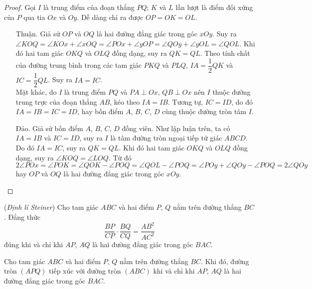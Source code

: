 \documentclass{article} %
\begin{document}
        \begin{proof}
            Gọi \(I\) là trung điểm của đoạn thẳng \(PQ\); \(K\) và \(L\) lần lượt là điểm đối xứng của \(P\) qua tia \(Ox\) và \(Oy\). Dễ dàng chỉ ra được \(OP = OK = OL\).

            \begin{enumerate}[leftmargin=1.25cm]
                \item[Thuận.] Giả sử \(OP\) và \(OQ\) là hai đường đẳng giác trong góc \(xOy\). Suy ra \(\angle KOQ = \angle KOx + \angle xOQ = \angle POx + \angle yOP = \angle QOy + \angle yOL = \angle QOL\). Khi đó hai tam giác \(OKQ\) và \(OLQ\) đồng dạng, suy ra \(QK = QL\). Theo tính chất của đường trung bình trong các tam giác \(PKQ\) và \(PLQ\), \(IA = \dfrac{1}{2}QK\) và \(IC = \dfrac{1}{2}QL\). Suy ra \(IA = IC\).\\
                Mặt khác, do \(I\) là trung điểm \(PQ\) và \(PA \perp Ox\), \(QB \perp Ox\) nên \(I\) thuộc đường trung trực của đoạn thẳng \(AB\), kéo theo \(IA = IB\). Tương tự, \(IC = ID\), do đó \(IA = IB = IC = ID\), hay bốn điểm \(A\), \(B\), \(C\), \(D\) cùng thuộc đường tròn tâm \(I\).
                \item[Đảo.] Giả sử bốn điểm \(A\), \(B\), \(C\), \(D\) đồng viên. Như lập luận trên, ta có \(IA = IB\) và \(IC = ID\), suy ra \(I\) là tâm đường tròn ngoại tiếp tứ giác \(ABCD\). Do đó \(IA = IC\), suy ra \(QK = QL\). Khi đó hai tam giác \(OKQ\) và \(OLQ\) đồng dạng, suy ra \(\angle KOQ = \angle LOQ\). Từ đó
                \[2 \angle POx = \angle POK = \angle QOK - \angle POQ = \angle QOL - \angle POQ = \angle POy + \angle QOy - \angle POQ = 2 \angle QOy\]
                hay \(OP\) và \(OQ\) là hai đường đẳng giác trong góc \(xOy\).
            \end{enumerate}
            
        \end{proof}

        \begin{theorem}
            (\textit{Định lí Steiner}) Cho tam giác \(ABC\) và hai điểm \(P\), \(Q\) nằm trên đường thẳng \(BC\). Đẳng thức
            \[\frac{BP}{CP} \cdot \frac{BQ}{CQ} = \frac{AB^2}{AC^2}\]
            đúng khi và chỉ khi \(AP\), \(AQ\) là hai đường đẳng giác trong góc \(BAC\).
        \end{theorem}

        \begin{property}
            Cho tam giác \(ABC\) và hai điểm \(P\), \(Q\) nằm trên đường thẳng \(BC\). Khi đó, đường tròn \((APQ)\) tiếp xúc với đường tròn \((ABC)\) khi và chỉ khi \(AP\), \(AQ\) là hai đường đẳng giác trong góc \(BAC\).
        \end{property}
\end{document}
